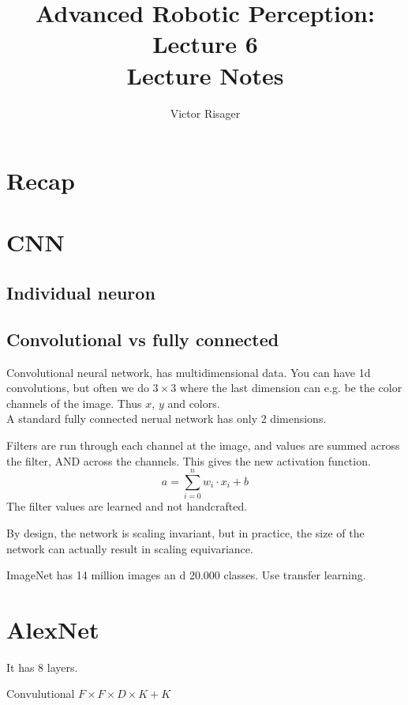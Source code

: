 \documentclass[a4paper]{article}
\title{Advanced Robotic Perception: Lecture 6 \\
	\large Lecture Notes}
\author{Victor Risager}
\begin{document}
\maketitle
\section{Recap}

\section{CNN}

\subsection{Individual neuron}

\subsection{Convolutional vs fully connected}


Convolutional neural network, has multidimensional data. You can have 1d convolutions, but often we do $ 3 \times 3$ where the last dimension can e.g. be the color channels of the image. Thus $ x $, $ y $ and colors.\\ A standard fully connected nerual network has only 2 dimensions. 


Filters are run through each channel at the image, and values are summed across the filter, AND across the channels. This gives the new activation function.
\begin{equation}
 a = \sum_{i=0}^{n}{w_i \cdot x_i + b} 
\end{equation}
The filter values are learned and not handcrafted.


\hfill {}

By design, the network is scaling invariant, but in practice, the size of the network can actually result in scaling equivariance.


ImageNet has 14 million images an d 20.000 classes. Use transfer learning.

\section{AlexNet}
It has 8 layers. 



Convulutional 
$ F  \times  F \times  D \times  K + K $
\end{document}
